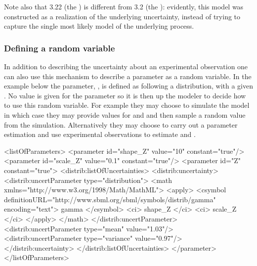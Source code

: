 \documentclass[draftspec]{sbmlpkgspec}
\begin{document}
Note also that 3.22 (the ) is different from 3.2 (the ):  evidently, this model was constructed as a realization of the underlying uncertainty, instead of trying to capture the single most likely model of the underlying process.


\subsubsection{Defining a random variable}

In addition to describing the uncertainty about an experimental
observation one can also use this mechanism to describe a parameter as
a random variable. In the example below the parameter, , is defined
as following a  distribution, with a given . No
value is given for the parameter so it is then up the modeler to
decide how to use this random variable. For example they may choose to
simulate the model in which case they may provide values for 
and  and then sample a random value from the
simulation. Alternatively they may choose to carry out a parameter
estimation and use experimental observations to estimate  and
.


\begin{example}
<listOfParameters>
  <parameter id="shape_Z" value="10" constant="true"/>
  <parameter id="scale_Z" value="0.1" constant="true"/>
  <parameter id="Z" constant="true">
    <distrib:listOfUncertainties>
      <distrib:uncertainty>
        <distrib:uncertParameter type="distribution">
          <math xmlns="http://www.w3.org/1998/Math/MathML">
            <apply>
              <csymbol definitionURL="http://www.sbml.org/sbml/symbols/distrib/gamma"
                       encoding="text"> gamma </csymbol>
              <ci> shape_Z </ci>
              <ci> scale_Z </ci>
            </apply>
          </math>
        </distrib:uncertParameter>
        <distrib:uncertParameter type="mean" value="1.03"/>
        <distrib:uncertParameter type="variance" value="0.97"/>
      </distrib:uncertainty>
    </distrib:listOfUncertainties>
  </parameter>
</listOfParameters>
\end{example}
\end{document}

